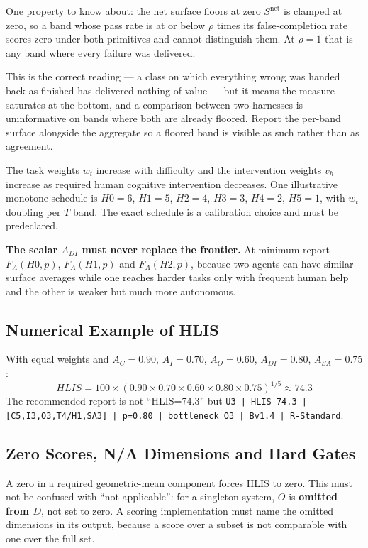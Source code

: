 \documentclass[11pt]{article}
\theoremstyle{definition}
\begin{document}
\begin{cautionbox}{One property to know about: the net surface floors at zero}
$S^{\text{net}}$ is clamped at zero, so a band whose pass rate is at or below
$\rho$ times its false-completion rate scores zero under both primitives and
cannot distinguish them. At $\rho = 1$ that is any band where every failure was
delivered.

This is the correct reading --- a class on which everything wrong was handed
back as finished has delivered nothing of value --- but it means the measure
saturates at the bottom, and a comparison between two harnesses is uninformative
on bands where both are already floored. Report the per-band surface alongside
the aggregate so a floored band is visible as such rather than as agreement.
\end{cautionbox}

\sloppy The task weights $w_t$ increase with difficulty and the intervention weights $v_h$ increase as required human cognitive intervention decreases. One illustrative monotone schedule is $H0{=}6$, $H1{=}5$, $H2{=}4$, $H3{=}3$, $H4{=}2$, $H5{=}1$, with $w_t$ doubling per $T$ band. The exact schedule is a calibration choice and must be predeclared.

\textbf{The scalar $A_{DI}$ must never replace the frontier.} At minimum report $F_A(H0,p)$, $F_A(H1,p)$ and $F_A(H2,p)$, because two agents can have similar surface averages while one reaches harder tasks only with frequent human help and the other is weaker but much more autonomous.

\subsection{Numerical Example of HLIS}

With equal weights and $A_C=0.90$, $A_I=0.70$, $A_O=0.60$, $A_{DI}=0.80$, $A_{SA}=0.75$:
\begin{equation*}
HLIS = 100 \times (0.90 \times 0.70 \times 0.60 \times 0.80 \times 0.75)^{1/5} \approx 74.3
\end{equation*}
The recommended report is not ``HLIS=74.3'' but
\texttt{U3 | HLIS 74.3 | [C5,I3,O3,T4/H1,SA3] | p=0.80 | bottleneck O3 | Bv1.4 | R-Standard}.

\subsection{Zero Scores, N/A Dimensions and Hard Gates}

A zero in a required geometric-mean component forces HLIS to zero. This must not be confused with ``not applicable'': for a singleton system, $O$ is \textbf{omitted from $D$}, not set to zero. A scoring implementation must name the omitted dimensions in its output, because a score over a subset is not comparable with one over the full set.
\end{document}
